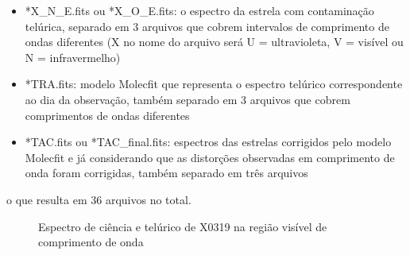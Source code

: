 \begin{itemize}
    \item *X\_N\_E.fits ou *X\_O\_E.fits: o espectro da estrela com contaminação telúrica, separado em 3 arquivos que cobrem intervalos de comprimento de ondas diferentes (X no nome do arquivo será U = ultravioleta, V = visível ou N = infravermelho)
    \item *TRA.fits: modelo Molecfit que representa o espectro telúrico correspondente ao dia da observação, também separado em 3 arquivos que cobrem comprimentos de ondas diferentes
    \item *TAC.fits ou *TAC\_final.fits: espectros das estrelas corrigidos pelo modelo Molecfit e já considerando que as distorções observadas em comprimento de onda foram corrigidas, também separado em três arquivos
\end{itemize}

\noindent o que resulta em 36 arquivos no total.

\begin{figure}[htb]
  \centering
  \hfill
  \caption{Espectro de ciência e telúrico de X0319 na região visível de comprimento de onda}
  \label{fig:x0319-visible}
\end{figure}



